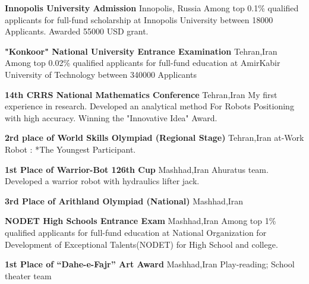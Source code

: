 {\textbf{Innopolis University Admission}}
{Innopolis, Russia}
{}
{}
{
Among top 0.1\% qualified applicants for full-fund scholarship at Innopolis University between 18000 Applicants. Awarded 55000 USD grant.
}

{\textbf{"Konkoor" National University Entrance Examination}}
{Tehran,Iran}
{}
{}
{
Among top 0.02\% qualified applicants for full-fund education at AmirKabir University of Technology between 340000 Applicants
}
  
{\textbf{14th CRRS National Mathematics Conference}}
{Tehran,Iran}
{}
{}
{
My first experience in research. Developed an analytical method For Robots Positioning with high accuracy. Winning the "Innovative Idea" Award.
}


{\textbf{2rd place of World Skills Olympiad (Regional Stage)}}
{Tehran,Iran}
{}
{}
{
  at-Work Robot : *The Youngest Participant.
}


{\textbf{1st Place of Warrior-Bot 126th Cup }}
{Mashhad,Iran}
{}
{}
{
   Ahuratus team. Developed a warrior robot with hydraulics lifter jack.
}


{\textbf{3rd Place of Arithland Olympiad (National) }}
{Mashhad,Iran}
{}
{}
{}

{\textbf{NODET High Schools Entrance Exam}}
{Mashhad,Iran}
{}
{}
{
Among top 1\% qualified applicants for full-fund education at National Organization for Development of Exceptional Talents(NODET) for High School and college.
}

{\textbf{1st Place of “Dahe-e-Fajr” Art Award }}
{Mashhad,Iran}
{}
{}
{
	Play-reading; School theater team
}
